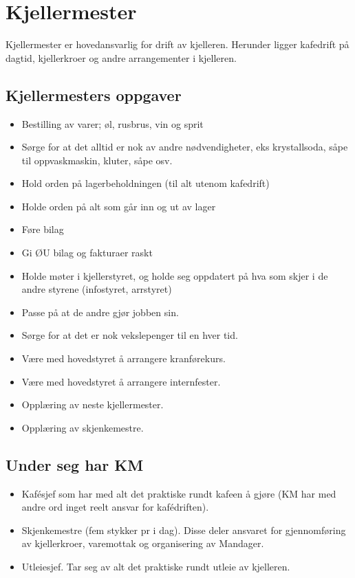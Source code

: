 \section{Kjellermester}

Kjellermester er hovedansvarlig for drift av kjelleren. Herunder ligger kafedrift på dagtid, kjellerkroer og andre arrangementer i kjelleren. 

\subsection{Kjellermesters oppgaver}
\begin{itemize}
\item Bestilling av varer; øl, rusbrus, vin og sprit
\item Sørge for at det alltid er nok av andre nødvendigheter,
      eks krystallsoda, såpe til oppvaskmaskin, kluter, såpe osv.
\item Hold orden på lagerbeholdningen (til alt utenom kafedrift)
\item Holde orden på alt som går inn og ut av lager
\item Føre bilag
\item Gi ØU bilag og fakturaer raskt
\item Holde møter i kjellerstyret, og holde seg oppdatert på
      hva som skjer i de andre styrene (infostyret, arrstyret)
\item Passe på at de andre gjør jobben sin.
\item Sørge for at det er nok vekslepenger til en hver tid.
\item Være med hovedstyret å arrangere kranførekurs.
\item Være med hovedstyret å arrangere internfester.
\item Opplæring av neste kjellermester.
\item Opplæring av skjenkemestre.
\end{itemize}

\subsection{Under seg har KM}
\begin{itemize}
\item Kaf\'esjef som har med alt det praktiske rundt kafeen å gjøre
      (KM har med andre ord inget reelt ansvar for kaf\'edriften).
\item Skjenkemestre (fem stykker pr i dag). Disse deler ansvaret
      for gjennomføring av kjellerkroer, varemottak og organisering
      av Mandager.
\item Utleiesjef. Tar seg av alt det praktiske rundt utleie av kjelleren.
\end{itemize}

